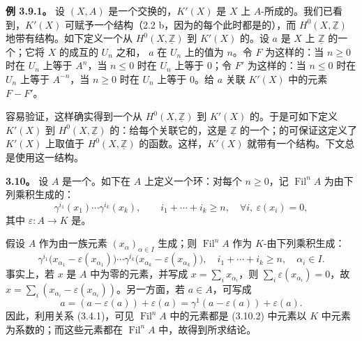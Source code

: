 \textbf{例 3.9.1。} 设 $(X,A)$ 是一个交换的，$K'(X)$ 是 $X$ 上 $A$-所成的。我们已看到，$K'(X)$ 可赋予一个结构（2.2 b，因为的每个此时都是的），而 $H^0(X,\underline{\mathbb Z})$ 地带有结构。如下定义一个从 $H^0(X,\underline{\mathbb Z})$ 到 $K'(X)$ 的。设 $a$ 是 $X$ 上 $\underline{\mathbb Z}$ 的一个；它将 $X$ 的成互的 $U_n$ 之和， $a$ 在 $U_n$ 上的值为 $n$。令 $F$ 为这样的：当 $n\geqslant0$ 时在 $U_n$ 上等于 $A^n$，当 $n\leqslant0$ 时在 $U_n$ 上等于 $0$；令 $F'$ 为这样的：当 $n\leqslant0$ 时在 $U_n$ 上等于 $A^{-n}$，当 $n\geqslant0$ 时在 $U_n$ 上等于 $0$。给 $a$ 关联 $K'(X)$ 中的元素 $F-F'$。

容易验证，这样确实得到一个从 $H^0(X,\underline{\mathbb Z})$ 到 $K'(X)$ 的。于是可如下定义 $K'(X)$ 到 $H^0(X,\underline{\mathbb Z})$ 的：给每个关联它的，这是 $\underline{\mathbb Z}$ 的一个；的可保证这定义了 $K'(X)$ 上取值于 $H^0(X,\underline{\mathbb Z})$ 的函数。这样，$K'(X)$ 就带有一个结构。下文总是使用这一结构。

\textbf{3.10。} 设 $A$ 是一个。如下在 $A$ 上定义一个环：对每个 $n\geqslant0$，记 $\operatorname{Fil}^nA$ 为由下列乘积生成的：
\[
\gamma^{i_1}(x_1)\cdots\gamma^{i_k}(x_k),\qquad
 i_1+\cdots+i_k\geqslant n,\quad\forall i,\ \varepsilon(x_i)=0,
\tag{3.10.1}
\]
其中 $\varepsilon:A\longrightarrow K$ 是。

假设 $A$ 作为由一族元素 $(x_\alpha)_{\alpha\in I}$ 生成；则 $\operatorname{Fil}^nA$ 作为 $K$-由下列乘积生成：
\[
\gamma^{i_1}\bigl(x_{\alpha_1}-\varepsilon(x_{\alpha_1})\bigr)\cdots
\gamma^{i_k}\bigl(x_{\alpha_k}-\varepsilon(x_{\alpha_k})\bigr),\quad
 i_1+\cdots+i_k\geqslant n,\quad\alpha_i\in I.
\tag{3.10.2}
\]
事实上，若 $x$ 是 $A$ 中为零的元素，并写成 $x=\sum_i x_{\alpha_i}$，则 $\sum_i\varepsilon(x_{\alpha_i})=0$，故 $x=\sum_i(x_{\alpha_i}-\varepsilon(x_{\alpha_i}))$。另一方面，若 $a\in A$，可写成
\[
a=(a-\varepsilon(a))+\varepsilon(a)
=\gamma^1(a-\varepsilon(a))+\varepsilon(a).
\]
因此，利用关系 (3.4.1)，可见 $\operatorname{Fil}^nA$ 中的元素都是 (3.10.2) 中元素以 $K$ 中元素为系数的；而这些元素都在 $\operatorname{Fil}^nA$ 中，故得到所求结论。

